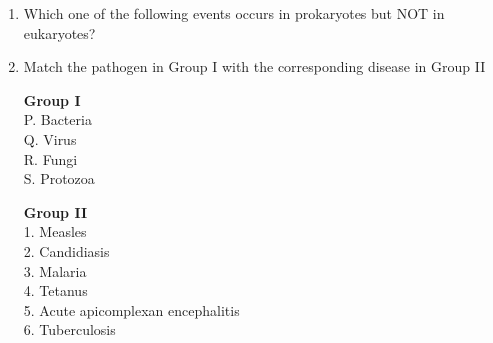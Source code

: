 \documentclass[journal,12pt,onecolumn]{IEEEtran}
\theoremstyle{remark}
\begin{document}
\begin{enumerate}
\item Which one of the following events occurs in prokaryotes but NOT in eukaryotes?

\hfill{}

\begin{enumerate}
\end{enumerate}

 \item Match the pathogen in Group I with the corresponding disease in Group II
    
    \begin{minipage}[t]{0.5\textwidth}
        \textbf{Group I} \\
        P. Bacteria \\
        Q. Virus \\
        R. Fungi \\
        S. Protozoa
    \end{minipage}%
    \begin{minipage}[t]{0.5\textwidth}
        \textbf{Group II} \\
        1. Measles \\
        2. Candidiasis \\
        3. Malaria \\
        4. Tetanus \\
        5. Acute apicomplexan encephalitis \\
        6. Tuberculosis
    \end{minipage}

    \hfill{}

    \begin{enumerate}
    \end{enumerate}


\end{enumerate}
\end{document}

